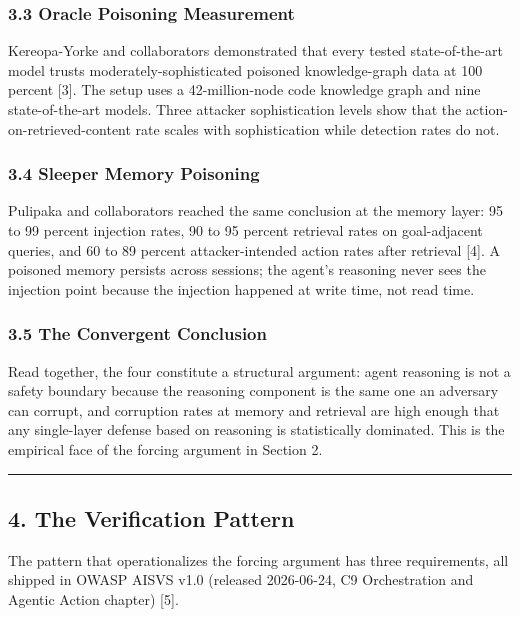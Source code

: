 \documentclass[
  11pt,
]{article}
\begin{document}
\subsubsection{3.3 Oracle Poisoning
Measurement}\label{oracle-poisoning-measurement}

Kereopa-Yorke and collaborators demonstrated that every tested
state-of-the-art model trusts moderately-sophisticated poisoned
knowledge-graph data at 100 percent {[}3{]}. The setup uses a
42-million-node code knowledge graph and nine state-of-the-art models.
Three attacker sophistication levels show that the
action-on-retrieved-content rate scales with sophistication while
detection rates do not.

\subsubsection{3.4 Sleeper Memory
Poisoning}\label{sleeper-memory-poisoning}

Pulipaka and collaborators reached the same conclusion at the memory
layer: 95 to 99 percent injection rates, 90 to 95 percent retrieval
rates on goal-adjacent queries, and 60 to 89 percent attacker-intended
action rates after retrieval {[}4{]}. A poisoned memory persists across
sessions; the agent's reasoning never sees the injection point because
the injection happened at write time, not read time.

\subsubsection{3.5 The Convergent
Conclusion}\label{the-convergent-conclusion}

Read together, the four constitute a structural argument: agent
reasoning is not a safety boundary because the reasoning component is
the same one an adversary can corrupt, and corruption rates at memory
and retrieval are high enough that any single-layer defense based on
reasoning is statistically dominated. This is the empirical face of the
forcing argument in Section 2.

\begin{center}\rule{0.5\linewidth}{0.5pt}\end{center}

\subsection{4. The Verification Pattern}\label{the-verification-pattern}

The pattern that operationalizes the forcing argument has three
requirements, all shipped in OWASP AISVS v1.0 (released 2026-06-24, C9
Orchestration and Agentic Action chapter) {[}5{]}.
\end{document}
